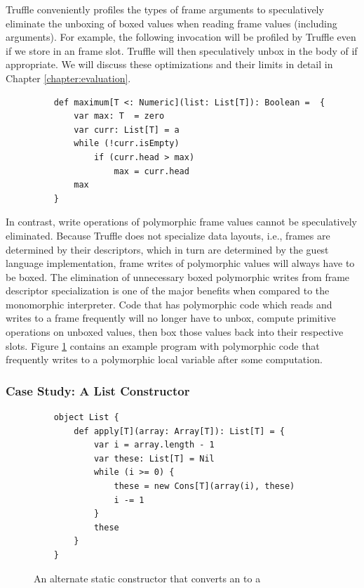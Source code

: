 Truffle conveniently profiles the types of frame arguments to speculatively eliminate the unboxing of boxed values when reading frame values (including arguments). 
For example, the following invocation  will be profiled by Truffle even if we store  in an  frame slot.
Truffle will then speculatively unbox  in the body of  if appropriate.
We will discuss these optimizations and their limits in detail in Chapter \ref{chapter:evaluation}.

\begin{figure}[!htb]
	\begin{verbatim}
	def maximum[T <: Numeric](list: List[T]): Boolean =  {
		var max: T  = zero
		var curr: List[T] = a
		while (!curr.isEmpty) 
			if (curr.head > max)
				max = curr.head 
		max
	}
	\end{verbatim}
	\caption{}
	\label{impl:list-max}
\end{figure}

In contrast, write operations of polymorphic frame values cannot be speculatively eliminated. 
Because Truffle does not specialize data layouts, i.e., frames are determined by their descriptors, which in turn are determined by the guest language implementation, frame writes of polymorphic values will always have to be boxed.
The elimination of unnecessary boxed polymorphic writes from frame descriptor specialization is one of the major benefits when compared to the monomorphic interpreter.
Code that has polymorphic code which reads and writes to a frame frequently will no longer have to unbox, compute primitive operations on unboxed values, then box those values back into their respective slots.
Figure \ref{impl:list-max} contains an example program with polymorphic code that frequently writes to a polymorphic local variable after some computation.

\subsubsection*{Case Study: A List Constructor}

\begin{figure}[!htb]
	\begin{verbatim}
	object List {
		def apply[T](array: Array[T]): List[T] = {
			var i = array.length - 1
			var these: List[T] = Nil
			while (i >= 0) {
				these = new Cons[T](array(i), these)
				i -= 1
			}
			these
		}	
	}
	\end{verbatim}
	\caption{An alternate static constructor that converts an  to a }
	\label{impl:list-alt-constructor}
\end{figure}

